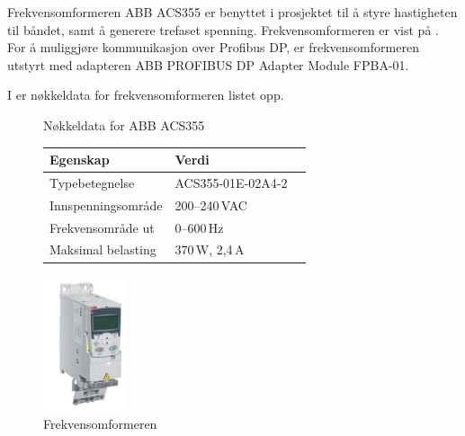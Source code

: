 \documentclass[Visionprosjekt.tex]{subfiles}
\begin{document}
Frekvensomformeren ABB ACS355 er benyttet i prosjektet til å styre hastigheten til båndet, samt å generere trefaset spenning.  Frekvensomformeren er vist på . For å muliggjøre kommunikasjon over Profibus DP, er frekvensomformeren utstyrt med adapteren ABB PROFIBUS DP Adapter Module FPBA-01. 

I  er nøkkeldata for frekvensomformeren listet opp.


\begin{figure}[ht]
    \begin{minipage}[c]{0.65\textwidth}
        \centering
            \caption{Nøkkeldata for ABB ACS355 \cite{frekvensdata}}
            \renewcommand\arraystretch{1.2}
            \begin{tabular}{llX}        
                \toprule
                Egenskap	&	Verdi					 \\
                \midrule
                Typebetegnelse        & ACS355-01E-02A4-2\\
                Innspenningsområde    & 200--240\,VAC    \\
                Frekvensområde ut     & 0--600\,Hz       \\
                Maksimal belasting    & 370\,W, 2,4\,A   \\
               \bottomrule
            \end{tabular}
            \label{tab:frekvens}
    \end{minipage}
    \begin{minipage}[c]{0.25\textwidth}
        \centering
        \includegraphics[height=4cm]{bilder/frekvensomformer.pdf}
        \caption{\mbox{Frekvens}\-\mbox{omformeren}}
        \label{fig:frekvensomformer}
    \end{minipage}
\end{figure}
\end{document}
